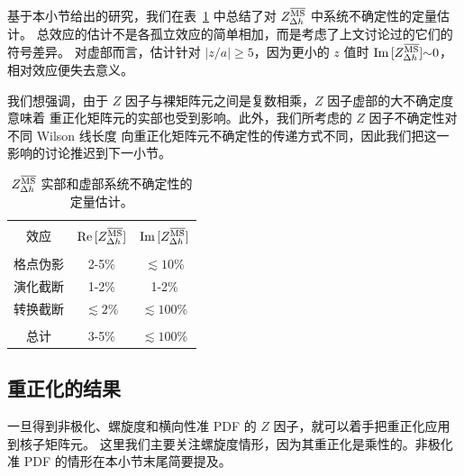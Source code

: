 \bigskip
基于本小节给出的研究，我们在表~\ref{tab2} 中总结了对 $Z_{\Delta h}^{\overline{\rm MS}}$ 中系统不确定性的定量估计。
总效应的估计不是各孤立效应的简单相加，而是考虑了上文讨论过的它们的符号差异。
对虚部而言，估计针对 $|z/a|\geq5$，因为更小的 $z$ 值时 ${\rm Im}\,[Z_{\Delta h}^{\overline{\rm MS}}]{\sim}0$，
相对效应便失去意义。

我们想强调，由于 $Z$ 因子与裸矩阵元之间是复数相乘，$Z$ 因子虚部的大不确定度意味着
重正化矩阵元的实部也受到影响。此外，我们所考虑的 $Z$ 因子不确定性对不同 Wilson 线长度
向重正化矩阵元不确定性的传递方式不同，因此我们把这一影响的讨论推迟到下一小节。

{\small{
\begin{table}[!h]
\vspace*{0.25cm}
\begin{center}
\begin{tabular}{ccc}
\hline
\hline\\[-2ex]
效应 & ${\rm Re}\,[Z_{\Delta h}^{\overline{\rm MS}}]$   &  ${\rm Im}\,[Z_{\Delta h}^{\overline{\rm MS}}]$ \\[0.5ex]
\hline
\hline\\[-2ex]
格点伪影 & 2-5\% & $\lesssim10$\% \\[1ex]
演化截断& 1-2\% & 1-2\% \\[1ex]
转换截断& $\lesssim2$\% & $\lesssim100$\% \\[2ex]
\hline\\[-1.5ex]
总计 & 3-5\% &  $\lesssim100$\% \\[1ex]
\hline
\hline
\end{tabular}
\vspace*{-0.4cm}
\begin{center}
\begin{minipage}{14cm}
\hspace*{3cm}
\caption{\small{$Z_{\Delta h}^{\overline{\rm MS}}$ 实部和虚部系统不确定性的定量估计。}}
\label{tab2}
\end{minipage}
\end{center}
\end{center}
\end{table}
}}

\subsection{重正化的结果}
\label{sub3.2}

一旦得到非极化、螺旋度和横向性准 PDF 的 $Z$ 因子，就可以着手把重正化应用到核子矩阵元。
这里我们主要关注螺旋度情形，因为其重正化是乘性的。非极化准 PDF 的情形在本小节末尾简要提及。

